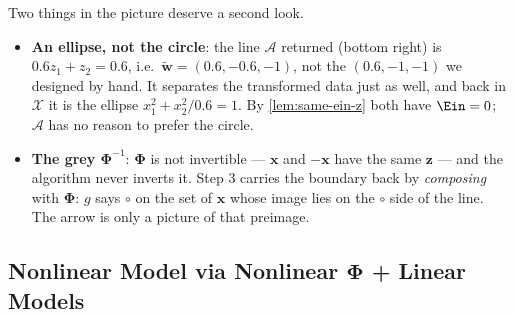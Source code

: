 Two things in the picture deserve a second look.
\begin{itemize}
    \item \textbf{An ellipse, not the circle}: the line \(\mathcal{A}\)
        returned (bottom right) is \(0.6 z_1 + z_2 = 0.6\), i.e.\
        \(\tilde{\bm{w}} = (0.6, -0.6, -1)\), not the \((0.6, -1, -1)\) we
        designed by hand. It separates the transformed data just as well, and
        back in \(\mathcal{X}\) it is the ellipse \(x_1^2 + x_2^2/0.6 = 1\).
        By \autoref{lem:same-ein-z} both have \(\Ein = 0\); \(\mathcal{A}\) has
        no reason to prefer the circle.
    \item \textbf{The grey \(\bm{\Phi}^{-1}\)}: \(\bm{\Phi}\) is not
        invertible --- \(\bm{x}\) and \(-\bm{x}\) have the same \(\bm{z}\) ---
        and the algorithm never inverts it. Step 3 carries the boundary back
        by \emph{composing} with \(\bm{\Phi}\): \(g\) says \(\circ\) on the
        set of \(\bm{x}\) whose image lies on the \(\circ\) side of the line.
        The arrow is only a picture of that preimage.
\end{itemize}

\subsection{Nonlinear Model via Nonlinear \texorpdfstring{\(\bm{\Phi}\)}{Phi}
+ Linear Models}

